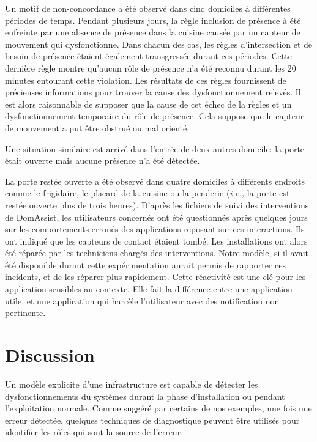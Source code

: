 Un motif de non-concordance a été observé dans cinq domiciles à différentes périodes de temps. Pendant plusieurs jours, la règle inclusion de présence à été enfreinte par une absence de présence dans la cuisine causée par un capteur de mouvement qui dysfonctionne. Dans chacun des cas, les règles d'intersection et de besoin de présence étaient également transgressée durant ces périodes. Cette dernière règle montre qu'aucun rôle de présence n'a été reconnu durant les 20 minutes entourant cette violation. Les résultats de ces règles fournissent de précieuses informations pour trouver la cause des dysfonctionnement relevés. Il est alors raisonnable de supposer que la cause de cet échec de la règles et un dysfonctionnement temporaire du rôle de présence. Cela suppose que le capteur de mouvement a put être obstrué ou mal orienté. 

Une situation similaire est arrivé dans l'entrée de deux autres domicile: la porte était ouverte mais aucune présence n'a été détectée.

La porte restée ouverte a été observé dans quatre domiciles à différents endroits comme le frigidaire, le placard de la cuisine ou la penderie ({\em i.e.,} la porte est restée ouverte plus de trois heures). D'après les fichiers de suivi des interventions de DomAssist, les utilisateurs concernés ont été questionnés après quelques jours sur les comportements erronés des applications reposant sur ces interactions. Ils ont indiqué que les capteurs de contact étaient tombé. Les installations ont alors été réparée par les techniciens chargés des interventions. Notre modèle, si il avait été disponible durant cette expérimentation aurait permis de rapporter ces incidents, et de les réparer plus rapidement. Cette réactivité est une clé pour les application sensibles au contexte. Elle fait la différence entre une application utile, et une application qui harcèle l'utilisateur avec des notification non pertinente.

\section{Discussion}\label{sec:discussion}
Un modèle explicite d'une infrastructure est capable de détecter les dysfonctionnements du systèmes durant la phase d'installation ou pendant l'exploitation normale. Comme suggéré par certains de nos exemples, une fois une erreur détectée, quelques techniques de diagnostique peuvent être utilisés pour identifier les rôles qui sont la source de l'erreur.  

